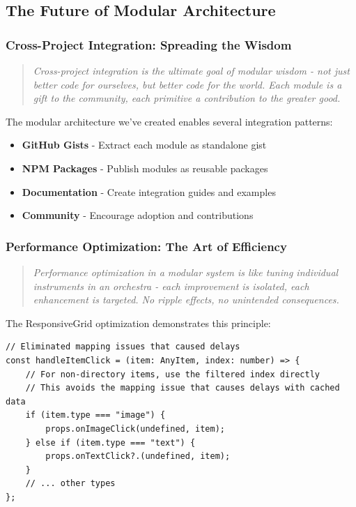 \documentclass[11pt]{article}
\begin{document}
\subsection{The Future of Modular Architecture}

\subsubsection{Cross-Project Integration: Spreading the Wisdom}

\begin{quote}
\emph{Cross-project integration is the ultimate goal of modular wisdom - not just better code for ourselves, but better code for the world. Each module is a gift to the community, each primitive a contribution to the greater good.}
\end{quote}

The modular architecture we've created enables several integration patterns:

\begin{itemize}
\item \textbf{GitHub Gists} - Extract each module as standalone gist
\item \textbf{NPM Packages} - Publish modules as reusable packages
\item \textbf{Documentation} - Create integration guides and examples
\item \textbf{Community} - Encourage adoption and contributions
\end{itemize}

\subsubsection{Performance Optimization: The Art of Efficiency}

\begin{quote}
\emph{Performance optimization in a modular system is like tuning individual instruments in an orchestra - each improvement is isolated, each enhancement is targeted. No ripple effects, no unintended consequences.}
\end{quote}

The ResponsiveGrid optimization demonstrates this principle:

\begin{lstlisting}[style=typescript]
// Eliminated mapping issues that caused delays
const handleItemClick = (item: AnyItem, index: number) => {
    // For non-directory items, use the filtered index directly
    // This avoids the mapping issue that causes delays with cached data
    if (item.type === "image") {
        props.onImageClick(undefined, item);
    } else if (item.type === "text") {
        props.onTextClick?.(undefined, item);
    }
    // ... other types
};
\end{lstlisting}
\end{document}
